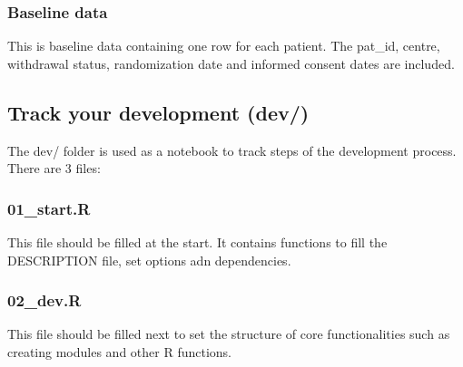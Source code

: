 \documentclass[]{article}
\newenvironment{Shaded}{\begin{snugshade}}{\end{snugshade}}
\newcommand{\CommentTok}[1]{\textcolor[rgb]{0.56,0.35,0.01}{\textit{#1}}}
\newcommand{\KeywordTok}[1]{\textcolor[rgb]{0.13,0.29,0.53}{\textbf{#1}}}
\newcommand{\NormalTok}[1]{#1}
\begin{document}
\hypertarget{baseline-data}{%
\subsubsection{Baseline data}\label{baseline-data}}

This is baseline data containing one row for each patient. The pat\_id,
centre, withdrawal status, randomization date and informed consent dates
are included.

\begin{Shaded}
\end{Shaded}

\hypertarget{track-your-development-dev}{%
\subsection{\texorpdfstring{\textbf{Track your development}
(dev/)}{Track your development (dev/)}}\label{track-your-development-dev}}

The dev/ folder is used as a notebook to track steps of the development
process. There are 3 files:

\hypertarget{start.r}{%
\subsubsection{01\_start.R}\label{start.r}}

This file should be filled at the start. It contains functions to fill
the DESCRIPTION file, set options adn dependencies.

\hypertarget{dev.r}{%
\subsubsection{02\_dev.R}\label{dev.r}}

This file should be filled next to set the structure of core
functionalities such as creating modules and other R functions.
\end{document}

